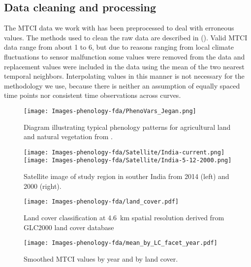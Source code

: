 \subsection{Data cleaning and processing} %
\label{sub:data_cleaning_and_processing}

The MTCI data we work with has been preprocessed to deal with erroneous values. The methods used to clean the raw data are described in (\cite{Dash:2010kva}). Valid MTCI data range from about 1 to 6, but due to reasons ranging from local climate fluctuations to sensor malfunction some values were removed from the data and replacement values were included in the data using the mean of the two nearest temporal neighbors. Interpolating values in this manner is not necessary for the methodology we use, because there is neither an assumption of equally spaced time points nor consistent time observations across curves.


\begin{figure}
	[htbp] \centering 
	\texttt{[image: Images-phenology-fda/PhenoVars\_Jegan.png]} \caption{Diagram illustrating typical phenology patterns for agricultural land and natural vegetation from \cite{Dash:2010kva}. } \label{fig:phenology diagram} 
\end{figure}



\begin{figure}
	[htbp] \centering 
	\texttt{[image: Images-phenology-fda/Satellite/India-current.png]} 
	\texttt{[image: Images-phenology-fda/Satellite/India-5-12-2000.png]} \caption{Satellite image of study region in souther India from 2014 (left) and 2000 (right).} \label{fig:india} 
\end{figure}

\begin{figure}
	[htbp] \centering 
	\texttt{[image: Images-phenology-fda/land\_cover.pdf]} \caption{Land cover classification at 4.6~km spatial resolution derived from GLC2000 land cover database} \label{fig:land cover} 
\end{figure}

\begin{figure}
	[htbp] \centering 
	\texttt{[image: Images-phenology-fda/mean\_by\_LC\_facet\_year.pdf]} \caption{Smoothed MTCI values by year and by land cover.} \label{fig:mean by LC} 
\end{figure}

